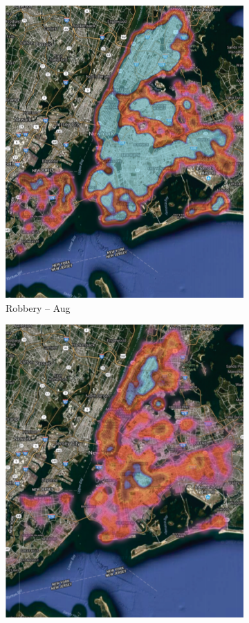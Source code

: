 \begin{figure}[t]
\begin{subfigure}{0.24\textwidth}
        \includegraphics[width=0.9\linewidth]{Chapter5/Images/robbery.png}
        \caption{Robbery – Aug}
        \label{fig:subim2}
    \end{subfigure}
    \begin{subfigure}{0.24\textwidth}
        \centering
        \includegraphics[width=0.9\linewidth]{Chapter5/Images/felony.png}

\end{subfigure}
\end{figure}
